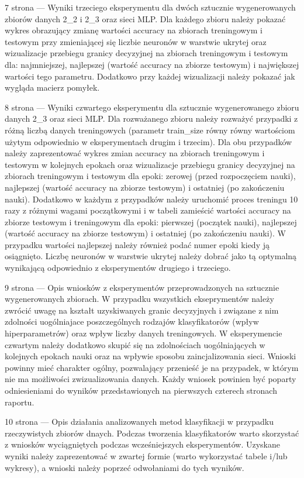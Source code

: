 \documentclass[12pt]{article}
\begin{document}
\clearpage

7 strona --- Wyniki trzeciego eksperymentu dla dwóch sztucznie wygenerowanych zbiorów danych 2\_2 i 2\_3 oraz sieci MLP. Dla każdego zbioru należy pokazać wykres obrazujący zmianę wartości accuracy na zbiorach treningowym i testowym przy zmieniającej się liczbie neuronów w warstwie ukrytej oraz wizualizacje przebiegu granicy decyzyjnej na zbiorach treningowym i testowym dla: najmniejszej, najlepszej (wartość accuracy na zbiorze testowym) i największej wartości tego parametru. Dodatkowo przy każdej wizualizacji należy pokazać jak wygląda macierz pomyłek.

\clearpage

8 strona --- Wyniki czwartego eksperymentu dla sztucznie wygenerowanego zbioru danych 2\_3 oraz sieci MLP. Dla rozważanego zbioru należy rozważyć przypadki z różną liczbą danych treningowych (parametr train\_size równy równy wartościom użytym odpowiednio w eksperymentach drugim i trzecim). Dla obu przypadków należy zaprezentować wykres zmian accuracy na zbiorach treningowym i testowym w kolejnych epokach oraz wizualizacje przebiegu granicy decyzyjnej na zbiorach treningowym i testowym dla epoki: zerowej (przed rozpoczęciem nauki), najlepszej (wartość accuracy na zbiorze testowym) i ostatniej (po zakończeniu nauki).
Dodatkowo w każdym z przypadków należy uruchomić proces treningu 10 razy z różnymi wagami początkowymi i w tabeli zamieścić wartości accuracy na zbiorze testowym i treningowym dla epoki: pierwszej (początek nauki), najlepszej (wartość accuracy na zbiorze testowym) i ostatniej (po zakończeniu nauki). W przypadku wartości najlepszej należy również podać numer epoki kiedy ją osiągnięto. Liczbę neuronów w warstwie ukrytej należy dobrać jako tą optymalną wynikającą odpowiednio z eksperymentów drugiego i trzeciego.

\clearpage

9 strona --- Opis wniosków z eksperymentów przeprowadzonych na sztucznie wygenerowanych zbiorach. W przypadku wszystkich ekseprymentów należy zwrócić uwagę na kształt uzyskiwanych granic decyzyjnych i związane z nim zdolności uogólniajace poszczególnych rodzajów klasyfikatorów (wpływ hiperparametrów) oraz wpływ liczby danych treningowych. W eksperymencie czwartym należy dodatkowo skupić się na zdolnościach uogólniających w kolejnych epokach nauki oraz na wpływie sposobu zaincjalizowania sieci. Wnioski powinny mieć charakter ogólny, pozwalający przenieść je na przypadek, w którym nie ma możliwości zwizualizowania danych. Każdy wniosek powinien być poparty odniesieniami do wyników przedstawionych na pierwszych czterech stronach raportu.

\clearpage

10 strona --- Opis działania analizowanych metod klasyfikacji w przypadku rzeczywistych zbiorów dnaych. Podczas tworzenia klasyfikatorów warto skorzystać z wniosków wyciągniętych podczas wcześniejszych eksperymentów. Uzyskane wyniki należy zaprezentować w zwartej formie (warto wykorzystać tabele i/lub wykresy), a wnioski należy poprzeć odwołaniami do tych wyników.
\end{document}
